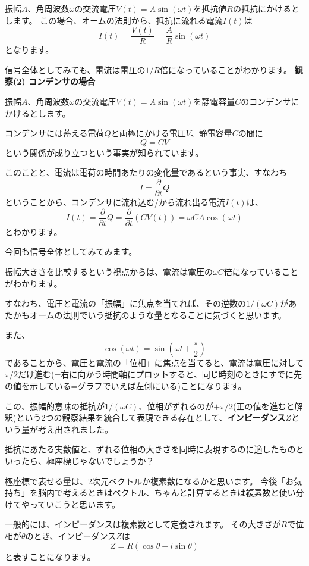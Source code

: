 振幅$A$、角周波数$\omega$の交流電圧$V(t) = A\sin(\omega t)$を抵抗値$R$の抵抗にかけるとします。
この場合、オームの法則から、抵抗に流れる電流$I(t)$は
$$I(t) = \frac{V(t)}{R} = \frac{A}{R}\sin(\omega t)$$
となります。

信号全体としてみても、電流は電圧の$1/R$倍になっていることがわかります。
\newline
\newline
\textbf{観察(2) コンデンサの場合}

振幅$A$、角周波数$\omega$の交流電圧$V(t) = A\sin(\omega t)$を静電容量$C$のコンデンサにかけるとします。

コンデンサには蓄える電荷$Q$と両極にかける電圧$V$、静電容量$C$の間に
$$ Q = CV $$
という関係が成り立つという事実が知られています。

このことと、電流は電荷の時間あたりの変化量であるという事実、すなわち
$$ I = \frac{\partial}{\partial t}Q $$
ということから、コンデンサに流れ込む/から流れ出る電流$I(t)$は、
$$I(t) = \frac{\partial}{\partial t}Q  = \frac{\partial}{\partial t}(CV(t)) = \omega C A\cos(\omega t)$$
とわかります。

今回も信号全体としてみてみます。

振幅大きさを比較するという視点からは、電流は電圧の$\omega C$倍になっていることがわかります。

すなわち、電圧と電流の「振幅」に焦点を当てれば、その逆数の$1/(\omega C)$があたかもオームの法則でいう抵抗のような量となることに気づくと思います。

また、
$$\cos(\omega t) = \sin \left(\omega t + \frac{\pi}{2}\right)$$
であることから、電圧と電流の「位相」に焦点を当てると、電流は電圧に対して$\pi/2$だけ進む(=右に向かう時間軸にプロットすると、同じ時刻のときにすでに先の値を示している=グラフでいえば左側にいる)ことになります。

この、振幅的意味の抵抗が$1/(\omega C)$、位相がずれるのが$+\pi/2$(正の値を進むと解釈)という2つの観察結果を統合して表現できる存在として、\textbf{インピーダンス$Z$}という量が考え出されました。

抵抗にあたる実数値と、ずれる位相の大きさを同時に表現するのに適したものといったら、極座標じゃないでしょうか？

極座標で表せる量は、2次元ベクトルか複素数になるかと思います。
今後「お気持ち」を脳内で考えるときはベクトル、ちゃんと計算するときは複素数と使い分けてやっていこうと思います。

一般的には、インピーダンスは複素数として定義されます。
その大きさが$R$で位相が$\theta$のとき、インピーダンス$Z$は
$$ Z = R(\cos \theta + i \sin \theta)$$
と表すことになります。

